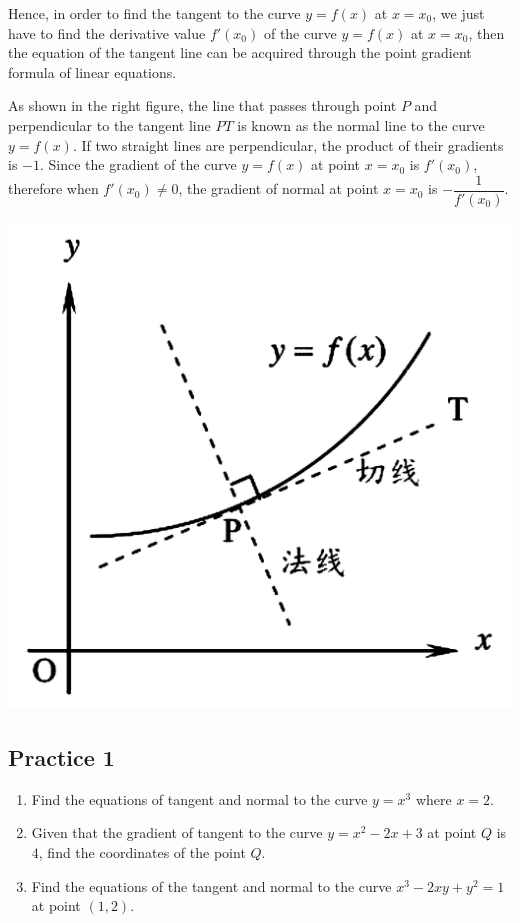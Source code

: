 \documentclass{report}
\begin{document}
\begin{multicols}{2}
    Hence, in order to find the tangent to the curve $y = f(x)$ at $x = x_0$, we just have to find the derivative value $f'(x_0)$ of the curve $y = f(x)$ at $x = x_0$, then the equation of the tangent line can be acquired through the point gradient formula of linear equations.

    As shown in the right figure, the line that passes through point $P$ and
    perpendicular to the tangent line $PT$ is known as the normal line to the curve
    $y = f(x)$. If two straight lines are perpendicular, the product of their
    gradients is $-1$. Since the gradient of the curve $y = f(x)$ at point $x =
        x_0$ is $f'(x_0)$, therefore when $f'(x_0) \neq 0$, the gradient of normal at
    point $x = x_0$ is $-\dfrac{1}{f'(x_0)}$.

    \columnbreak
    \begin{center}
        \includegraphics[scale=0.25]{assets/26-1.png}
    \end{center}
\end{multicols}

\subsection{Practice 1}
\begin{enumerate}
    \item Find the equations of tangent and normal to the curve $y = x^3$ where $x = 2$.
    \item Given that the gradient of tangent to the curve $y = x^2 - 2x + 3$ at point $Q$
          is $4$, find the coordinates of the point $Q$.
    \item Find the equations of the tangent and normal to the curve $x^3 - 2xy + y^2 = 1$
          at point $(1, 2)$.
\end{enumerate}
\end{document}
